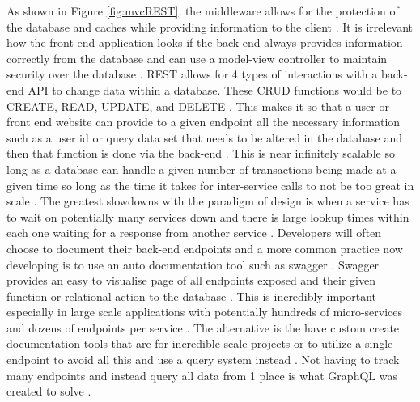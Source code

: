 As shown in Figure \ref{fig:mvcREST}, the middleware allows for the protection of the database and caches while providing information to the client \cite{Chen1_Ji1_Fan1_Zhan2_2017}. It is irrelevant how the front end application looks if the back-end always provides information correctly from the database and can use a model-view controller to maintain security over the database \cite{Chen1_Ji1_Fan1_Zhan2_2017}.
\newline
\newline
REST allows for 4 types of interactions with a back-end API to change data within a database. These CRUD functions would be to CREATE, READ, UPDATE, and DELETE \cite{Hartig_Pérez_2018}. This makes it so that a user or front end website can provide to a given endpoint all the necessary information such as a user id or query data set that needs to be altered in the database and then that function is done via the back-end \cite{Haupt_Leymann_Scherer_Vukojevic-Haupt_2017}. This is near infinitely scalable so long as a database can handle a given number of transactions being made at a given time so long as the time it takes for inter-service calls to not be too great in scale \cite{Li_Manoharan_2013}. The greatest slowdowns with the paradigm of design is when a service has to wait on potentially many services down and there is large lookup times within each one waiting for a response from another service \cite{Li_Manoharan_2013}.
\newline
\newline
Developers will often choose to document their back-end endpoints and a more common practice now developing is to use an auto documentation tool such as swagger \cite{Haupt_Leymann_Scherer_Vukojevic-Haupt_2017}. Swagger provides an easy to visualise page of all endpoints exposed and their given function or relational action to the database \cite{Haupt_Leymann_Scherer_Vukojevic-Haupt_2017}. This is incredibly important especially in large scale applications with potentially hundreds of micro-services and dozens of endpoints per service \cite{Haupt_Leymann_Scherer_Vukojevic-Haupt_2017, Li_Manoharan_2013}. The alternative is the have custom create documentation tools that are for incredible scale projects or to utilize a single endpoint to avoid all this and use a query system instead \cite{Haupt_Leymann_Scherer_Vukojevic-Haupt_2017, Stubailo_2021}. Not having to track many endpoints and instead query all data from 1 place is what GraphQL was created to solve \cite{Brito_Valente_2020, Stubailo_2021}.
\newline
